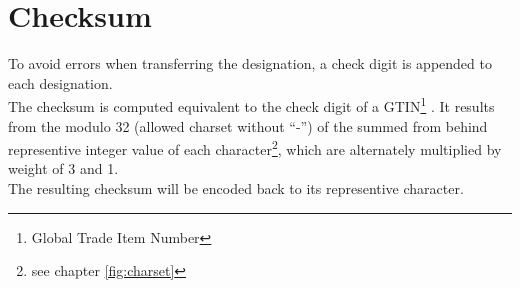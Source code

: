 %
%
%
%
%
%
%

\section{Checksum}
\label{chap:checksum}

To avoid errors when transferring the designation, a check digit is appended to
each designation. \\

The checksum is computed equivalent to the check digit of a
GTIN\footnote{Global Trade Item Number} \cite{ean_checksum}. It results from
the modulo 32 (allowed charset without ``-'') of the summed from behind
representive integer value of each character\footnote{\label{foot:charset}see
chapter \ref{fig:charset}}, which are alternately multiplied by weight of 3 and
1. \\

The resulting checksum will be encoded back to its representive character.

